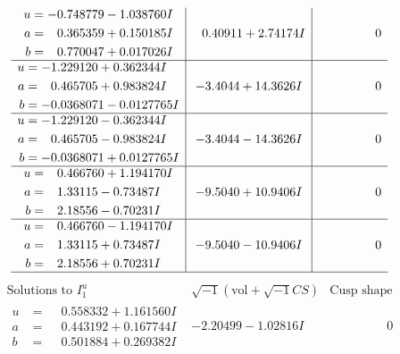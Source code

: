 \documentclass[1p]{elsarticle_modified}
\theoremstyle{definition}
\newcommand{\I}{\sqrt{-1}}
\begin{document}
$$\begin{array}{c|c|c}
\begin{aligned}
u &= -0.748779 - 1.038760 I \\
a &= \phantom{-}0.365359 + 0.150185 I \\
b &= \phantom{-}0.770047 + 0.017026 I\end{aligned}
 & \phantom{-}0.40911 + 2.74174 I & \phantom{-0.000000 } 0 \\ \hline\begin{aligned}
u &= -1.229120 + 0.362344 I \\
a &= \phantom{-}0.465705 + 0.983824 I \\
b &= -0.0368071 - 0.0127765 I\end{aligned}
 & -3.4044 + 14.3626 I & \phantom{-0.000000 } 0 \\ \hline\begin{aligned}
u &= -1.229120 - 0.362344 I \\
a &= \phantom{-}0.465705 - 0.983824 I \\
b &= -0.0368071 + 0.0127765 I\end{aligned}
 & -3.4044 - 14.3626 I & \phantom{-0.000000 } 0 \\ \hline\begin{aligned}
u &= \phantom{-}0.466760 + 1.194170 I \\
a &= \phantom{-}1.33115 - 0.73487 I \\
b &= \phantom{-}2.18556 - 0.70231 I\end{aligned}
 & -9.5040 + 10.9406 I & \phantom{-0.000000 } 0 \\ \hline\begin{aligned}
u &= \phantom{-}0.466760 - 1.194170 I \\
a &= \phantom{-}1.33115 + 0.73487 I \\
b &= \phantom{-}2.18556 + 0.70231 I\end{aligned}
 & -9.5040 - 10.9406 I & \phantom{-0.000000 } 0\\
 \hline 
 \end{array}$$\newpage$$\begin{array}{c|c|c}  
\text{Solutions to }I^u_{1}& \I (\text{vol} + \sqrt{-1}CS) & \text{Cusp shape}\\
 \hline 
\begin{aligned}
u &= \phantom{-}0.558332 + 1.161560 I \\
a &= \phantom{-}0.443192 + 0.167744 I \\
b &= \phantom{-}0.501884 + 0.269382 I\end{aligned}
 & -2.20499 - 1.02816 I & \phantom{-0.000000 } 0 \\ \hline\begin{aligned}

\end{aligned}
\end{array}$$
\end{document}
